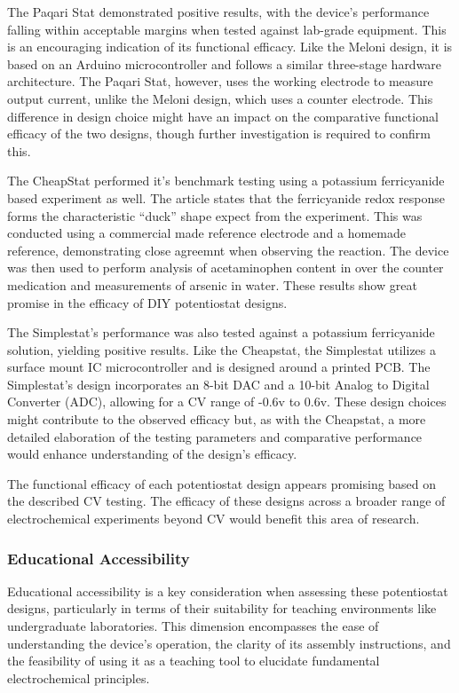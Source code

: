 \documentclass{article}
\begin{document}
The Paqari Stat demonstrated positive results, with the device's performance falling within acceptable margins when tested against lab-grade equipment. This is an encouraging indication of its functional efficacy. Like the Meloni design, it is based on an Arduino microcontroller and follows a similar three-stage hardware architecture. The Paqari Stat, however, uses the working electrode to measure output current, unlike the Meloni design, which uses a counter electrode. This difference in design choice might have an impact on the comparative functional efficacy of the two designs, though further investigation is required to confirm this.

The CheapStat performed it's benchmark testing using a potassium ferricyanide based experiment as well. The article states that the ferricyanide redox response forms the characteristic ``duck'' shape expect from the experiment. This was conducted using a commercial made reference electrode and a homemade reference, demonstrating close agreemnt when observing the reaction. The device was then used to perform analysis of acetaminophen content in over the counter medication and measurements of arsenic in water. These results show great promise in the efficacy of DIY potentiostat designs.

The Simplestat's performance was also tested against a potassium ferricyanide solution, yielding positive results. Like the Cheapstat, the Simplestat utilizes a surface mount IC microcontroller and is designed around a printed PCB. The Simplestat's design incorporates an 8-bit DAC and a 10-bit Analog to Digital Converter (ADC), allowing for a CV range of -0.6v to 0.6v. These design choices might contribute to the observed efficacy but, as with the Cheapstat, a more detailed elaboration of the testing parameters and comparative performance would enhance understanding of the design's efficacy.

The functional efficacy of each potentiostat design appears promising based on the described CV testing. The efficacy of these designs across a broader range of electrochemical experiments beyond CV would benefit this area of research.

\subsubsection*{Educational Accessibility}
Educational accessibility is a key consideration when assessing these potentiostat designs, particularly in terms of their suitability for teaching environments like undergraduate laboratories. This dimension encompasses the ease of understanding the device's operation, the clarity of its assembly instructions, and the feasibility of using it as a teaching tool to elucidate fundamental electrochemical principles.
\end{document}
